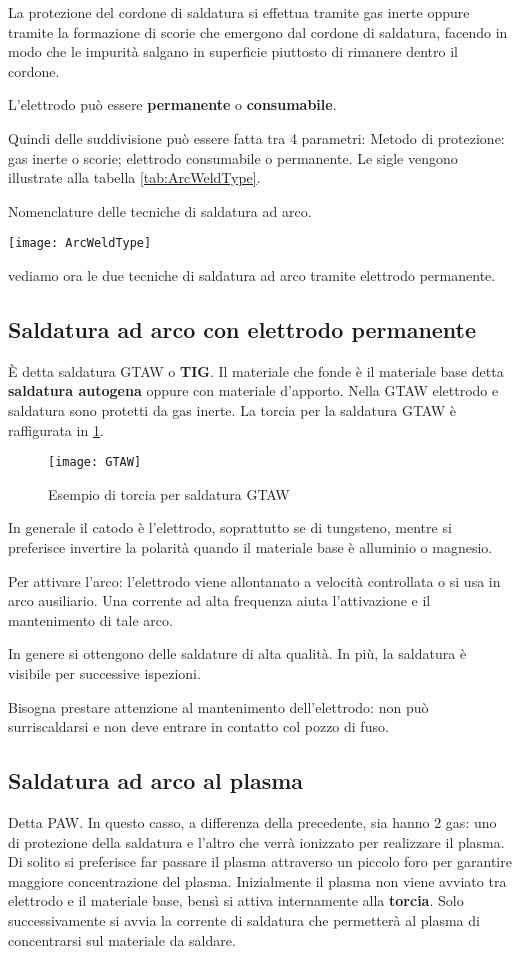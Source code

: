 La protezione del cordone di saldatura si effettua tramite gas inerte oppure tramite la formazione di scorie che emergono dal cordone di saldatura, facendo in modo che le impurità salgano in superficie piuttosto di rimanere dentro il cordone.

L'elettrodo può essere \textbf{permanente} o \textbf{consumabile}.

Quindi delle suddivisione può essere fatta tra 4 parametri: Metodo di protezione: gas inerte o scorie; elettrodo consumabile o permanente.
Le sigle vengono illustrate alla tabella \ref{tab:ArcWeldType}.

\begin{table}
\centering
\caption{Nomenclature delle tecniche di saldatura ad arco.}
\label{tab:ArcWeldType}
\texttt{[image: ArcWeldType]}
\end{table}

vediamo ora le due tecniche di saldatura ad arco tramite elettrodo permanente.

\subsection{Saldatura ad arco con elettrodo permanente}
È detta saldatura \ac{GTAW} o \textbf{TIG}.
Il materiale che fonde è il materiale base detta \textbf{saldatura autogena} oppure con materiale d'apporto.
Nella \ac{GTAW} elettrodo e saldatura sono protetti da gas inerte.
La torcia per la saldatura \ac{GTAW} è raffigurata in \ref{fig:GTAW}.
\begin{figure}
\centering
\texttt{[image: GTAW]}
\caption{Esempio di torcia per saldatura \ac{GTAW}}
\label{fig:GTAW}
\end{figure}

In generale il catodo è l'elettrodo, soprattutto se di tungsteno, mentre si preferisce invertire la polarità quando il materiale base è alluminio o magnesio.

Per attivare l'arco: l'elettrodo viene allontanato a velocità controllata o si usa in arco ausiliario.
Una corrente ad alta frequenza aiuta l'attivazione e il mantenimento di tale arco.

In genere si ottengono delle saldature di alta qualità.
In più, la saldatura è visibile per successive ispezioni.

Bisogna prestare attenzione al mantenimento dell'elettrodo: non può surriscaldarsi e non deve entrare in contatto col pozzo di fuso.

\subsection{Saldatura ad arco al plasma}
Detta \ac{PAW}.
In questo casso, a differenza della precedente, sia hanno 2 gas: uno di protezione della saldatura e l'altro che verrà ionizzato per realizzare il plasma.
Di solito si preferisce far passare il plasma attraverso un piccolo foro per garantire maggiore concentrazione del plasma.
Inizialmente il plasma non viene avviato tra elettrodo e il materiale base, bensì si attiva internamente alla \textbf{torcia}. Solo successivamente si avvia la corrente di saldatura che permetterà al plasma di concentrarsi sul materiale da saldare.

